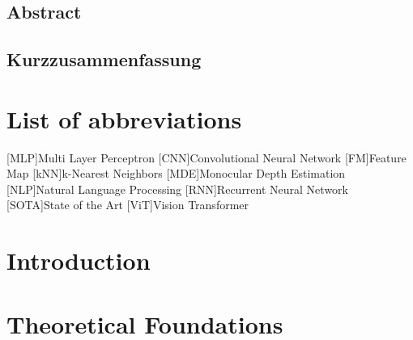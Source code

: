 \documentclass[12pt, twoside]{report_bachelorarbeit}
\renewcommand{\headrulewidth}{0.4pt}%
\renewcommand{\footrulewidth}{0.4pt}%
\renewcommand{\headrulewidth}{0.4pt}
\renewcommand{\footrulewidth}{0.4pt}
\begin{document}
\pagestyle{plain}

\section*{Abstract}

\newpage
\section*{Kurzzusammenfassung}

\newpage
%


\tableofcontents
\listoffigures
\listoftables

\chapter*{List of abbreviations}
\begin{acronym}
[MLP]{Multi Layer Perceptron}
[CNN]{Convolutional Neural Network}
[FM]{Feature Map}
[kNN]{k-Nearest Neighbors}
[MDE]{Monocular Depth Estimation}
[NLP]{Natural Language Processing}
[RNN]{Recurrent Neural Network}
[SOTA]{State of the Art}
[ViT]{Vision Transformer}
\end{acronym}

\pagestyle{fancy}
\setlength{\headheight}{14.5pt}
\fancyhead{}
\fancyfoot{}
\fancyfoot[LE,RO]{\thepage}
\renewcommand{\headrulewidth}{0.4pt}
\renewcommand{\footrulewidth}{0.4pt}

\chapter{Introduction}
\setcounter{page}{1}

\chapter{Theoretical Foundations}

\end{document}
